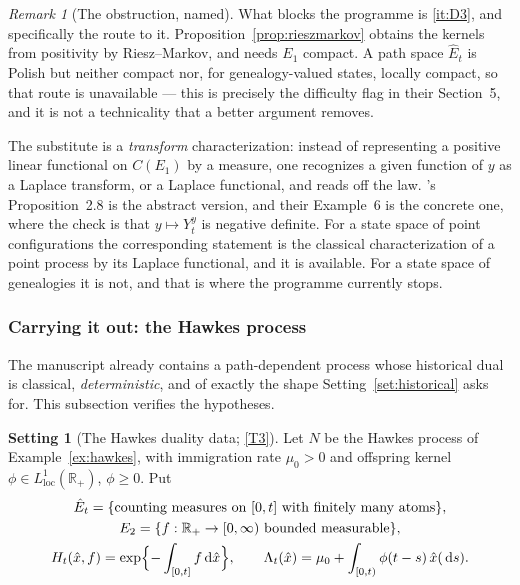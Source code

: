 \documentclass[11pt,a4paper]{article}
\theoremstyle{plain}
\theoremstyle{definition}
\newtheorem{setting}[theorem]{Setting}
\theoremstyle{remark}
\newtheorem{remark}[theorem]{Remark}
\newcommand{\R}{\mathbb{R}}
\newcommand{\Rp}{\R_+}
\newcommand{\DGP}{\cite{DGP24}}
\newcommand{\dif}{\,\mathrm{d}}
\begin{document}
\begin{remark}[The obstruction, named]
  \label{rem:histobstruction}
  What blocks the programme is \ref{it:D3}, and specifically the route to it.
  Proposition~\ref{prop:rieszmarkov} obtains the kernels from positivity by
  Riesz--Markov, and needs $E_1$ compact.  A path space $\hat{E}_t$ is Polish but
  neither compact nor, for genealogy-valued states, locally compact, so that route
  is unavailable --- this is precisely the difficulty \DGP{} flag in their
  Section~5, and it is not a technicality that a better argument removes.

  The substitute is a \emph{transform} characterization: instead of
  representing a positive linear functional on $C(E_1)$ by a measure, one
  recognizes a given function of $y$ as a Laplace transform, or a Laplace
  functional, and reads off the law.  \DGP's Proposition~2.8 is the abstract
  version, and their Example~6 is the concrete one, where the check is that
  $y \mapsto Y^y_t$ is negative definite.  For a state space of point
  configurations the corresponding statement is the classical characterization of
  a point process by its Laplace functional, and it is available.  For a state
  space of genealogies it is not, and that is where the programme currently
  stops.
\end{remark}

\subsubsection*{Carrying it out: the Hawkes process}

The manuscript already contains a path-dependent process whose historical dual is
classical, \emph{deterministic}, and of exactly the shape
Setting~\ref{set:historical} asks for.  This subsection verifies the hypotheses.

\begin{setting}[The Hawkes duality data; \eqref{T3}]
  \label{set:hawkesdual}
  Let $N$ be the Hawkes process of Example~\ref{ex:hawkes}, with immigration rate
  $\mu_0 > 0$ and offspring kernel $\phi \in L^1_{\mathrm{loc}}(\Rp)$, $\phi \geq 0$.
  Put
  \begin{gather*}
    \hat{E}_t = \{\text{counting measures on } [0,t] \text{ with finitely many atoms}\} , \\
    E_2 = \{ f : \Rp \to [0,\infty) \text{ bounded measurable} \} , \\
    H_t(\hat{x},f) = \exp\Bigl\{ -\int_{[0,t]} f \dif\hat{x} \Bigr\} ,
    \qquad
    \Lambda_t(\hat{x}) = \mu_0 + \int_{[0,t)} \phi(t-s) \, \hat{x}(\dif s) .
  \end{gather*}
\end{setting}
\end{document}
